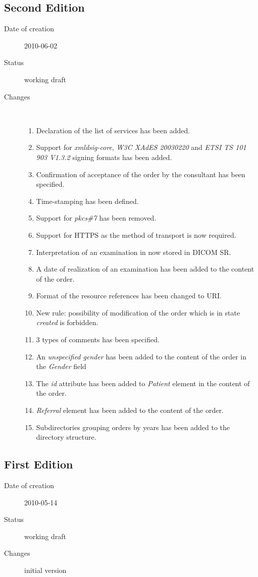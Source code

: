 \documentclass[a4paper]{article}
\begin{document}
\subsection{Second Edition}
\begin{description}
  \item[Date of creation] 2010-06-02
  \item[Status] working draft
  \item[Changes] \hfill \\
	\begin{enumerate}
      \item Declaration of the list of services has been added.
	  \item Support for \emph{xmldsig-core}, \emph{W3C XAdES 20030220} 
		and \emph{ETSI TS 101 903 V1.3.2} signing formats has been added.
	  \item Confirmation of acceptance of the order by the consultant has been specified.
	  \item Time-stamping has been defined.
      \item Support for \emph{pkcs\#7} has been removed.
      \item Support for HTTPS as the method of transport is now required.
      \item Interpretation of an examination in now stored in DICOM SR.
      \item A date of realization of an examination has been added to the content of the order.
      \item Format of the resource references has been changed to URI.
      \item New rule: possibility of modification of the order which is in state \emph{created}
		is forbidden.
      \item 3 types of comments has been specified.
      \item An \emph{unspecified gender} has been added to the content of the 
			order in the \emph{Gender} field
      \item The \emph{id} attribute has been added to \emph{Patient} element in the content
			of the order. 
      \item \emph{Referral} element has been added to the content of the order.
      \item Subdirectories grouping orders by years has been added to the directory 
		structure.
	\end{enumerate}
\end{description}

\subsection{First Edition}
\begin{description}
  \item[Date of creation] 2010-05-14
  \item[Status] working draft
  \item[Changes] initial version
\end{description}
\end{document}
